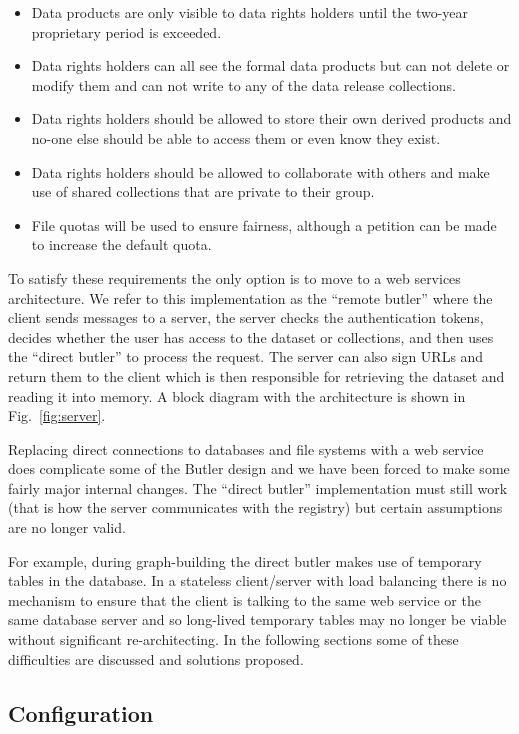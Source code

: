 \begin{itemize}
\item Data products are only visible to data rights holders until the two-year proprietary period is exceeded.
\item Data rights holders can all see the formal data products but can not delete or modify them and can not write to any of the data release collections.
\item Data rights holders should be allowed to store their own derived products and no-one else should be able to access them or even know they exist.
\item Data rights holders should be allowed to collaborate with others and make use of shared collections that are private to their group.
\item File quotas will be used to ensure fairness, although a petition can be made to increase the default quota.
\end{itemize}

To satisfy these requirements the only option is to move to a web services architecture.
We refer to this implementation as the ``remote butler'' where the client sends messages to a server, the server checks the authentication tokens, decides whether the user has access to the dataset or collections, and then uses the ``direct butler'' to process the request.
The server can also sign URLs and return them to the client which is then responsible for retrieving the dataset and reading it into memory.
A block diagram with the architecture is shown in Fig.~\ref{fig:server}.

Replacing direct connections to databases and file systems with a web service does complicate some of the Butler design and we have been forced to make some fairly major internal changes.
The ``direct butler'' implementation must still work (that is how the server communicates with the registry) but certain assumptions are no longer valid.

For example, during graph-building the direct butler makes use of temporary tables in the database.
In a stateless client/server with load balancing there is no mechanism to ensure that the client is talking to the same web service or the same database server and so long-lived temporary tables may no longer be viable without significant re-architecting.
In the following sections some of these difficulties are discussed and solutions proposed.

\subsection{Configuration}

